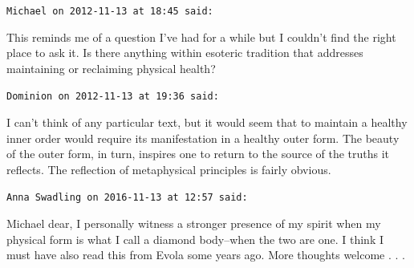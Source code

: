 \begin{footnotesize}\begin{sffamily}



\texttt{Michael on 2012-11-13 at 18:45 said: }

This reminds me of a question I've had for a while but I couldn't find the right place to ask it. Is there anything within esoteric tradition that addresses maintaining or reclaiming physical health?


\hfill

\texttt{Dominion on 2012-11-13 at 19:36 said: }

I can't think of any particular text, but it would seem that to maintain a healthy inner order would require its manifestation in a healthy outer form. The beauty of the outer form, in turn, inspires one to return to the source of the truths it reflects. The reflection of metaphysical principles is fairly obvious.


\hfill

\texttt{Anna Swadling on 2016-11-13 at 12:57 said: }

Michael dear, I personally witness a stronger presence of my spirit when my physical form is what I call a diamond body–when the two are one. I think I must have also read this from Evola some years ago. More thoughts welcome . . .


\end{sffamily}\end{footnotesize}
